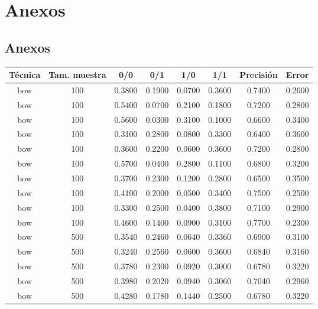 \chapter*{Anexos}\label{ch:anexos}

\section*{Anexos}
\addtocounter{section}{1}
\setcounter{subsection}{0}

\begin{table}[h!]
	\footnotesize
	\begin{tabularx}{\textwidth}{cccccccc}
		\toprule
		\textbf{Técnica} & \textbf{Tam. muestra} & \textbf{0/0} & \textbf{0/1} & \textbf{1/0} & \textbf{1/1} & \textbf{Precisión} & \textbf{Error} \\
		\midrule
		bow      & 100  & 0.3800 & 0.1900 & 0.0700 & 0.3600 & 0.7400 & 0.2600 \\
		bow      & 100  & 0.5400 & 0.0700 & 0.2100 & 0.1800 & 0.7200 & 0.2800 \\
		bow      & 100  & 0.5600 & 0.0300 & 0.3100 & 0.1000 & 0.6600 & 0.3400 \\
		bow      & 100  & 0.3100 & 0.2800 & 0.0800 & 0.3300 & 0.6400 & 0.3600 \\
		bow      & 100  & 0.3600 & 0.2200 & 0.0600 & 0.3600 & 0.7200 & 0.2800 \\
		bow      & 100  & 0.5700 & 0.0400 & 0.2800 & 0.1100 & 0.6800 & 0.3200 \\
		bow      & 100  & 0.3700 & 0.2300 & 0.1200 & 0.2800 & 0.6500 & 0.3500 \\
		bow      & 100  & 0.4100 & 0.2000 & 0.0500 & 0.3400 & 0.7500 & 0.2500 \\
		bow      & 100  & 0.3300 & 0.2500 & 0.0400 & 0.3800 & 0.7100 & 0.2900 \\
		bow      & 100  & 0.4600 & 0.1400 & 0.0900 & 0.3100 & 0.7700 & 0.2300 \\
		bow      & 500  & 0.3540 & 0.2460 & 0.0640 & 0.3360 & 0.6900 & 0.3100 \\
		bow      & 500  & 0.3240 & 0.2560 & 0.0600 & 0.3600 & 0.6840 & 0.3160 \\
		bow      & 500  & 0.3780 & 0.2300 & 0.0920 & 0.3000 & 0.6780 & 0.3220 \\
		bow      & 500  & 0.3980 & 0.2020 & 0.0940 & 0.3060 & 0.7040 & 0.2960 \\
		bow      & 500  & 0.4280 & 0.1780 & 0.1440 & 0.2500 & 0.6780 & 0.3220 \\

\end{tabularx}
\end{table}
